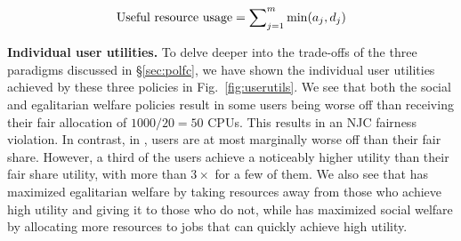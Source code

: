 
\begin{align}
\text{Useful resource usage}
= \sum\nolimits_{j=1}^m \min(a_{j}, d_j)
\label{eqn:effresusage}
\end{align}

\insertTableMetrics

\insertFigSP
\insertFigMSResults

\textbf{Individual user utilities.}
To delve deeper into the trade-offs of the three paradigms discussed in
\S\ref{sec:polfc}, we have shown the individual  user utilities achieved by these three policies
in Fig.~\ref{fig:userutils}.
We see that both the social and egalitarian welfare policies result in some users being worse off
than receiving their fair allocation of $1000/20=50$ CPUs.
This results in an NJC fairness violation.
In contrast, in \cilantronjc, users are at most marginally worse off than their fair share.
However, a third of the users achieve a noticeably higher utility than their fair share utility,
with more than $3\times$ for a few of them.
We also see that \cilantroews has  maximized egalitarian welfare by taking
resources away from those who achieve high utility and giving it to those who do not, while
\cilantrosws has maximized  social welfare by allocating more resources to jobs that
can quickly achieve high utility.




